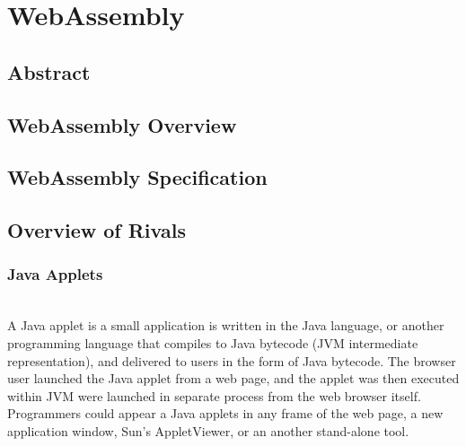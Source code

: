 \chapter{WebAssembly}

\section{Abstract}



\section{WebAssembly Overview}
\subsection{}
\subsection{}

\section{WebAssembly Specification}
\subsection{}
\subsection{}

\section{Overview of Rivals}
\subsection{Java Applets} \mbox{}\\
\indent A Java applet is a small application is written in the Java language, or another programming language that compiles to Java bytecode (JVM intermediate representation), and delivered to users in the form of Java bytecode. 
The browser user launched the Java applet from a web page, and the applet was then executed within JVM were launched in separate process from the web browser itself. 
Programmers could appear a Java applets in any frame of the web page, a new application window, Sun's AppletViewer, or an another stand-alone tool.

